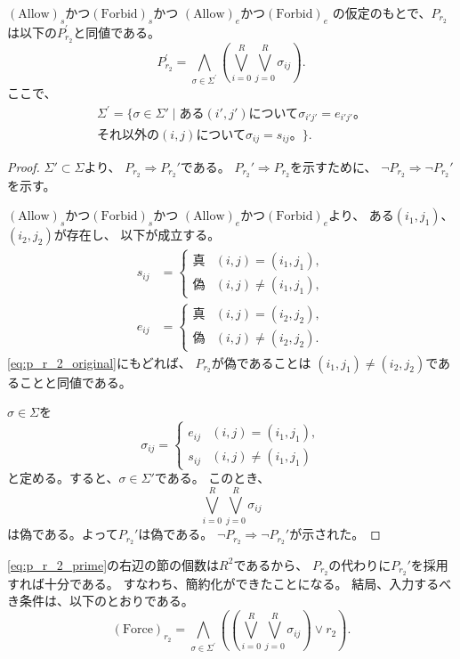 \begin{lem}
 $(\text{Allow})_s$かつ$(\text{Forbid})_s$かつ
 $(\text{Allow})_e$かつ$(\text{Forbid})_e$
 の仮定のもとで、$P_{r_2}$は以下の$P_{r_2}^{\prime}$と同値である。
 \begin{equation}
  P_{r_2}^{\prime} = \bigwedge_{\sigma \in \Sigma^{\prime}}
   \left( 
    \bigvee_{i=0}^R \bigvee_{j=0}^R \sigma_{ij} \right).
  \label{eq:p_r_2_prime}
 \end{equation}
 ここで、
 \begin{multline*}
  \Sigma^{\prime}
 = \{ \sigma \in \Sigma'
 \mid \text{ある$(i', j')$について$\sigma_{i'j'} = e_{i'j'}$。} \\
  \text{
 それ以外の$(i, j)$について$\sigma_{ij} = s_{ij}$。} \}.
 \end{multline*}
\end{lem}

\begin{proof}
 $\Sigma' \subset \Sigma$より、
 $P_{r_2} \Rightarrow P_{r_2}'$である。
 $P_{r_2}' \Rightarrow P_{r_2}$を示すために、
 $\lnot P_{r_2} \Rightarrow \lnot P_{r_2}'$を示す。
 
 $(\text{Allow})_s$かつ$(\text{Forbid})_s$かつ
 $(\text{Allow})_e$かつ$(\text{Forbid})_e$より、
 ある$(i_1, j_1)$、$(i_2, j_2)$が存在し、
 以下が成立する。
 \begin{align*}
  s_{ij} &=
  \begin{cases}
   \text{真} & (i, j) = (i_1, j_1), \\
   \text{偽} & (i, j) \neq (i_1, j_1),
  \end{cases} \\
  e_{ij} &=
  \begin{cases}
   \text{真} & (i, j) = (i_2, j_2), \\
   \text{偽} & (i, j) \neq (i_2, j_2).
  \end{cases}
 \end{align*}
 \eqref{eq:p_r_2_original}にもどれば、
 $P_{r_2}$が偽であることは
 $(i_1, j_1) \neq (i_2, j_2)$であることと同値である。
 
 $\sigma \in \Sigma$を
 \[
 \sigma_{ij} =
 \begin{cases}
  e_{ij} & (i, j) = (i_1, j_1), \\
  s_{ij} & (i, j) \neq (i_1, j_1)
 \end{cases}
 \]
 と定める。すると、$\sigma \in \Sigma'$である。
 このとき、
 \[
  \bigvee_{i = 0}^R
  \bigvee_{j = 0}^R \sigma_{ij}
 \]
 は偽である。よって$P_{r_2}'$は偽である。
 $\lnot P_{r_2} \Rightarrow \lnot P_{r_2}'$が示された。\qedhere
\end{proof}

\eqref{eq:p_r_2_prime}の右辺の節の個数は$R^2$であるから、
$P_{r_2}$の代わりに$P_{r_2}'$を採用すれば十分である。
すなわち、簡約化ができたことになる。
結局、入力するべき条件は、以下のとおりである。
\[
(\text{Force})_{r_2} = \bigwedge_{\sigma \in \Sigma^{\prime}}
   \left( 
   \left( 
    \bigvee_{i=0}^R \bigvee_{j=0}^R \sigma_{ij} \right)
    \lor r_2 \right).
\]


